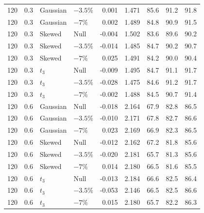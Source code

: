 \begin{longtable}{rrllrrrrr}
120 & 0.3 & Gaussian & $-3.5\%$ & 0.001 & 1.471 & 85.6 & 91.2 & 91.8 \\
120 & 0.3 & Gaussian & $-7\%$ & 0.002 & 1.489 & 84.8 & 90.9 & 91.5 \\
120 & 0.3 & Skewed & Null & -0.004 & 1.502 & 83.6 & 89.6 & 90.2 \\
120 & 0.3 & Skewed & $-3.5\%$ & -0.014 & 1.485 & 84.7 & 90.2 & 90.7 \\
120 & 0.3 & Skewed & $-7\%$ & 0.025 & 1.491 & 84.2 & 90.0 & 90.4 \\
120 & 0.3 & $t_3$ & Null & -0.009 & 1.495 & 84.7 & 91.1 & 91.7 \\
120 & 0.3 & $t_3$ & $-3.5\%$ & -0.028 & 1.475 & 84.6 & 91.2 & 91.7 \\
120 & 0.3 & $t_3$ & $-7\%$ & -0.002 & 1.488 & 84.5 & 90.7 & 91.4 \\
120 & 0.6 & Gaussian & Null & -0.018 & 2.164 & 67.9 & 82.8 & 86.5 \\
120 & 0.6 & Gaussian & $-3.5\%$ & -0.010 & 2.171 & 67.8 & 82.7 & 86.6 \\
120 & 0.6 & Gaussian & $-7\%$ & 0.023 & 2.169 & 66.9 & 82.3 & 86.5 \\
120 & 0.6 & Skewed & Null & -0.012 & 2.162 & 67.2 & 81.8 & 85.6 \\
120 & 0.6 & Skewed & $-3.5\%$ & -0.020 & 2.181 & 65.7 & 81.3 & 85.6 \\
120 & 0.6 & Skewed & $-7\%$ & 0.014 & 2.180 & 66.5 & 81.6 & 85.5 \\
120 & 0.6 & $t_3$ & Null & -0.013 & 2.184 & 66.6 & 82.5 & 86.4 \\
120 & 0.6 & $t_3$ & $-3.5\%$ & -0.053 & 2.146 & 66.5 & 82.5 & 86.6 \\
120 & 0.6 & $t_3$ & $-7\%$ & 0.015 & 2.180 & 65.7 & 82.2 & 86.3 \\
\end{longtable}

